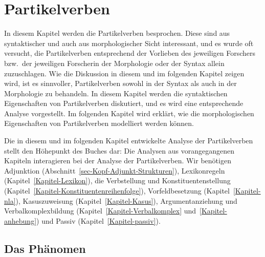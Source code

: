 \newcommand{\anf}{\emph{an$_5$}\xspace}%
\newcommand{\los}{\emph{los}\xspace}


\chapter{Partikelverben}
\label{Kapitel-partikel}

In diesem Kapitel werden die Partikelverben besprochen. Diese sind
aus syntaktischer und auch aus morphologischer Sicht interessant,
und es wurde oft versucht, die Partikelverben entsprechend der Vorlieben
des jeweiligen Forschers bzw.\ der jeweiligen Forscherin der Morphologie oder der Syntax allein zuzuschlagen.
Wie die Diskussion in diesem und im folgenden Kapitel zeigen wird, ist
es sinnvoller, Partikelverben sowohl in der Syntax als auch in der Morphologie
zu behandeln. In diesem Kapitel werden die syntaktischen Eigenschaften
von Partikelverben diskutiert, und es wird eine entsprechende Analyse vorgestellt.
Im folgenden Kapitel wird erklärt, wie die morphologischen Eigenschaften
von Partikelverben modelliert werden können.

Die in diesem und im folgenden Kapitel entwickelte Analyse der Partikelverben stellt
den Höhepunkt des Buches dar: Die Analysen aus vorangegangenen Kapiteln interagieren
bei der Analyse der Partikelverben. Wir benötigen Adjunktion (Abschnitt~\ref{sec-Kopf-Adjunkt-Strukturen}),
Lexikonregeln (Kapitel~\ref{Kapitel-Lexikon}), die Verbstellung und Konstituentenstellung 
(Kapitel~\ref{Kapitel-Konstituentenreihenfolge}), Vorfeldbesetzung (Kapitel~\ref{Kapitel-nla}),
Kasuszuweisung (Kapitel~\ref{Kapitel-Kasus}),
Argumentanziehung und Verbalkomplexbildung (Kapitel~\ref{Kapitel-Verbalkomplex} und~\ref{Kapitel-anhebung}) und Passiv (Kapitel~\ref{Kapitel-passiv}).
\largerpage

\section{Das Phänomen}

